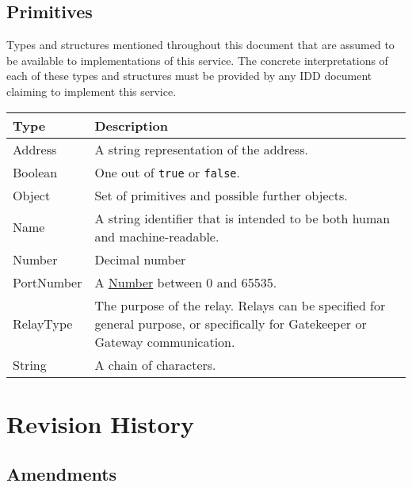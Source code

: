 \documentclass[a4paper]{arrowhead}
\newcommand{\pdef}[1]{{\textcolor{ArrowheadGrey}{#1\label{sec:model:primitives:#1}\label{sec:model:primitives:#1s}\label{sec:model:primitives:#1es}}}}
\newcommand{\pref}[1]{{\textcolor{ArrowheadGrey}{\hyperref[sec:model:primitives:#1]{#1}}}}
\begin{document}
\subsection{Primitives}
\label{sec:model:primitives}

Types and structures mentioned throughout this document that are assumed to be available to implementations of this service.
The concrete interpretations of each of these types and structures must be provided by any IDD document claiming to implement this service.

\begin{table}[ht!]
\begin{tabularx}{\textwidth}{| p{3cm} | X |} \hline
\rowcolor{gray!33} Type & Description \\ \hline
\pdef{Address}          & A string representation of the address. \\ \hline
\pdef{Boolean}          & One out of \texttt{true} or \texttt{false}. \\ \hline
\pdef{Object}           & Set of primitives and possible further objects. \\ \hline
\pdef{Name}             & A string identifier that is intended to be both human and machine-readable. \\ \hline
\pdef{Number}           & Decimal number \\ \hline
\pdef{PortNumber}       & A \pref{Number} between 0 and 65535. \\ \hline
\pdef{RelayType} & The purpose of the relay. Relays can be specified for general purpose, or specifically for Gatekeeper or Gateway communication. \\ \hline
\pdef{String}           & A chain of characters. \\ \hline

\end{tabularx}
\end{table}

\newpage




\newpage

\section{Revision History}
\subsection{Amendments}
\end{document}
